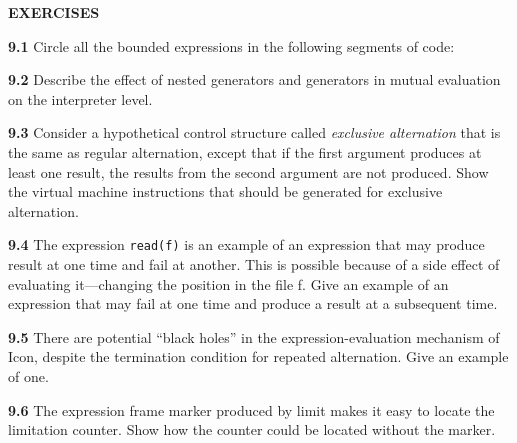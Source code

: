 \noindent\textbf{EXERCISES}

\textbf{9.1} Circle all the bounded expressions in the following segments of code:

\goodbreak
{}

\textbf{9.2} Describe the effect of nested generators and generators in mutual
evaluation on the interpreter level.

\textbf{9.3} Consider a hypothetical control structure called
\textit{exclusive alternation} that is the same as regular
alternation, except that if the first argument produces at least one
result, the results from the second argument are not produced. Show
the virtual machine instructions that should be generated for
exclusive alternation.

\textbf{9.4} The expression \texttt{read(f)} is an example of an expression
that may produce result at one time and fail at another. This is
possible because of a side effect of evaluating it---changing the
position in the file f. Give an example of an expression that may fail
at one time and produce a result at a subsequent time.

\textbf{9.5} There are potential ``black holes'' in
the expression-evaluation mechanism of Icon, despite the termination
condition for repeated alternation. Give an example of one.

\textbf{9.6} The expression frame marker produced by limit makes it easy to
locate the limitation counter. Show how the counter could be located
without the marker.

